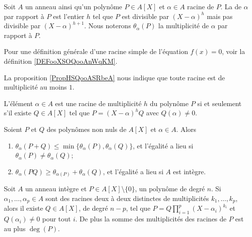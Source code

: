 \begin{definition}
  Soit \( A\) un anneau ainsi qu'un polynôme \( P\in A[X]\) et \( \alpha\in A\) racine de $P$. La  de \( \alpha\) par rapport à \( P\) est l'entier \( h\) tel que \( P\) est divisible par \( (X-\alpha)^h\) mais pas divisible par \( (X-\alpha)^{h+1}\).  Nous noterons \( \theta_{\alpha}(P)\) la multiplicité de \( \alpha\) par rapport à \( P\).
\end{definition}

Pour une définition générale d'une racine simple de l'équation \( f(x)=0\), voir la définition \ref{DEFooXSOQooAnWqKM}.

La proposition \ref{PropHSQooASRbeA} nous indique que toute racine est de multiplicité au moins \( 1\).

\begin{proposition} \label{PropahQQpA}
  L'élément \( \alpha\in A\) est une racine de multiplicité \( h\) du
  polynôme \( P\) si et seulement s'il existe \( Q\in A[X]\) tel que
  \( P=(X-\alpha)^hQ\) avec \( Q(\alpha)\neq 0\).
\end{proposition}

\begin{lemma}       \label{LemIeLhpc}
    Soient \( P\) et \( Q\) des polynômes non nuls de \( A[X]\) et \( \alpha\in A\). Alors
    \begin{enumerate}
        \item
            \( \theta_{\alpha}(P+Q)\leq\min\{
            \theta_{\alpha}(P),\theta_{\alpha}(Q) \}\), et l'égalité a
            lieu si \( \theta_{\alpha}(P)\neq \theta_{\alpha}(Q)\);
        \item     \label{ItemIeLhpciv}
            \( \theta_{\alpha}(PQ)\geq
            \theta_{\alpha(P)}+\theta_{\alpha}(Q)\), et l'égalité a
            lieu si \( A \) est intègre.
    \end{enumerate}
\end{lemma}

\begin{theorem} \label{ThoSVZooMpNANi} Soit \( A\) un anneau intègre
  et \( P\in A[X]\setminus\{ 0 \}\), un polynôme de degré \( n\). Si
  \( \alpha_1,\ldots, \alpha_p\in A\) sont des racines deux à deux
  distinctes de multiplicités \( k_1,\ldots, k_p\), alors il existe \(
  Q\in A[X]\), de degré \( n-p\), tel que \(
  P=Q\prod_{i=1}^p(X-\alpha_i)^{k_i}\) et \( Q(\alpha_i)\neq 0\) pour
  tout $i$.
    De plus la somme des multiplicités des racines de \( P\) est au plus \( \deg(P)\).
\end{theorem}

